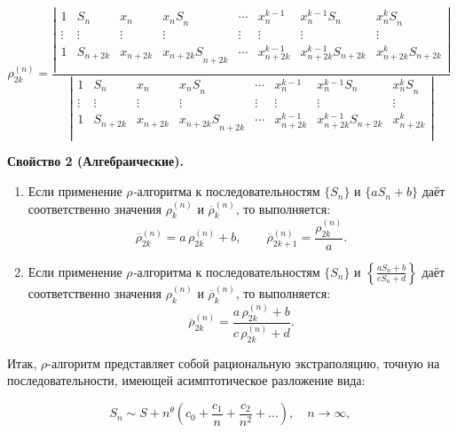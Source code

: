 \documentclass[14pt, a4paper]{extarticle}
\theoremstyle{definition}
\theoremstyle{remark}
\begin{document}
\[\rho_{2k}^{(n)} = \frac{\left| \begin{matrix}
1 & S_{n} & x_{n} & {x_{n}S}_{n} & \cdots & x_{n}^{k - 1} & x_{n}^{k - 1}S_{n} & {x_{n}^{k}S}_{n} \\
 \vdots & \vdots & \vdots & \vdots & \vdots & \vdots & \vdots & \vdots \\
1 & S_{n + 2k} & x_{n + 2k} & {x_{n + 2k}S}_{n + 2k} & \cdots & x_{n + 2k}^{k - 1} & x_{n + 2k}^{k - 1}S_{n + 2k} & x_{n + 2k}^{k}S_{n + 2k} \\
\end{matrix} \right|}{\left| \begin{matrix}
1 & S_{n} & x_{n} & {x_{n}S}_{n} & \cdots & x_{n}^{k - 1} & x_{n}^{k - 1}S_{n} & {x_{n}^{k}S}_{n} \\
 \vdots & \vdots & \vdots & \vdots & \vdots & \vdots & \vdots & \vdots \\
1 & S_{n + 2k} & x_{n + 2k} & {x_{n + 2k}S}_{n + 2k} & \cdots & x_{n + 2k}^{k - 1} & x_{n + 2k}^{k - 1}S_{n + 2k} & x_{n + 2k}^{k} \\
\end{matrix} \right|}\ \]

\textbf{Свойство 2 (Алгебраические).}  

\begin{enumerate}
    \item Если применение \emph{$\rho$-}алгоритма к последовательностям \(\{ S_{n} \}\) и \(\{ a S_{n} + b \}\) даёт соответственно значения \(\rho_{k}^{(n)}\) и \(\overline{\rho}_{k}^{(n)}\), то выполняется:
    \[
        \overline{\rho}_{2k}^{(n)} = a \, \rho_{2k}^{(n)} + b, \qquad
        \overline{\rho}_{2k + 1}^{(n)} = \frac{\rho_{2k}^{(n)}}{a}.
    \]
    
    \item Если применение \emph{$\rho$-}алгоритма к последовательностям \(\{ S_{n} \}\) и \(\left\{ \frac{a S_{n} + b}{c S_{n} + d} \right\}\) даёт соответственно значения \(\rho_{k}^{(n)}\) и \(\overline{\rho}_{k}^{(n)}\), то выполняется:
    \[
        \overline{\rho}_{2k}^{(n)} = \frac{a \, \rho_{2k}^{(n)} + b}{c \, \rho_{2k}^{(n)} + d}.
    \]
\end{enumerate}

Итак, \(\rho\)-алгоритм представляет собой рациональную экстраполяцию, точную на последовательности, имеющей асимптотическое разложение вида:

\[
    S_n \sim S + n^{\theta} \left( c_0 + \frac{c_1}{n} + \frac{c_2}{n^2} + \dots \right), \quad n \rightarrow \infty,
\]
\end{document}
